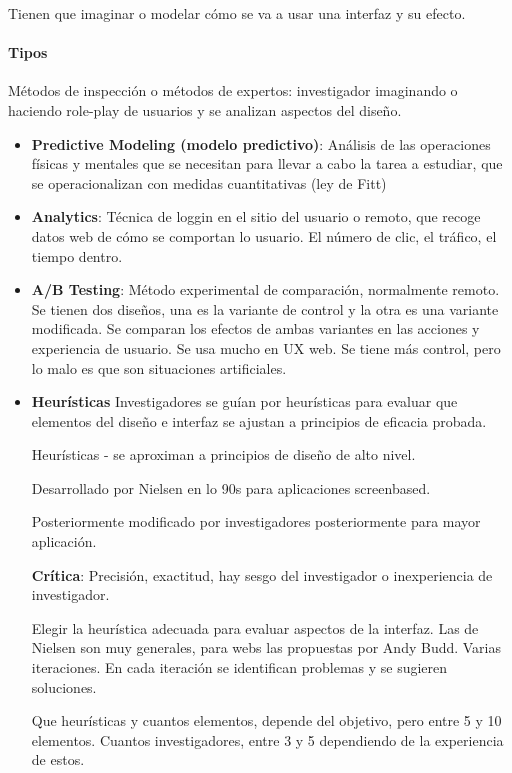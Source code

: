 \documentclass[12pt, twoside, openright]{report} %
\begin{document}
Tienen que imaginar o modelar cómo se va a usar una interfaz y su efecto.

\paragraph{Tipos}        
Métodos de inspección o métodos de expertos: investigador imaginando o haciendo role-play de usuarios y se analizan aspectos del diseño.

\begin{itemize}
  \item \textbf{Predictive Modeling (modelo predictivo)}: Análisis de las operaciones físicas y mentales que se necesitan para llevar a cabo la tarea a estudiar, que se operacionalizan con medidas cuantitativas (ley de Fitt)
  \item \textbf{Analytics}: Técnica de loggin en el sitio del usuario o remoto, que recoge datos web de cómo se comportan lo usuario. El número de clic, el tráfico, el tiempo dentro.
  \item \textbf{A/B Testing}: Método experimental de comparación, normalmente remoto. Se tienen dos diseños, una es la variante de control y la otra es una variante modificada. Se comparan los efectos de ambas variantes en las acciones y experiencia de usuario. Se usa mucho en UX web. Se tiene más control, pero lo malo es que son situaciones artificiales.
  \item \textbf{Heurísticas}
  Investigadores se guían por heurísticas para evaluar que elementos del diseño e interfaz se ajustan a principios de eficacia probada.
  
  Heurísticas - se aproximan a principios de diseño de alto nivel.
  
  Desarrollado por Nielsen en lo 90s para aplicaciones screenbased.
  
  Posteriormente modificado por investigadores posteriormente para mayor aplicación.
  
  \textbf{Crítica}: Precisión, exactitud, hay sesgo del investigador o inexperiencia de investigador.
  
  Elegir la heurística adecuada para evaluar aspectos de la interfaz. Las de Nielsen son muy generales, para webs las propuestas por Andy Budd. Varias iteraciones. En cada iteración se identifican problemas y se sugieren soluciones.
  
Que heurísticas y cuantos elementos, depende del objetivo, pero entre 5 y 10 elementos. Cuantos investigadores, entre 3 y 5 dependiendo de la experiencia de estos.


\end{itemize}
\end{document}
